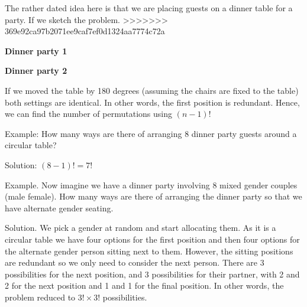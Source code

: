 \documentclass[12pt]{extbook}
\begin{document}
The rather dated idea here is that we are placing guests on a dinner table for a party.   If we sketch the problem.
>>>>>>> 369e92ca97b2071ee9caf7ef0d1324aa7774c72a

\begin{minipage}[t]{.45\textwidth}
\textbf{Dinner party 1}

\end{minipage}%
\begin{minipage}[t]{.45\textwidth}
\textbf{Dinner party 2}

\end{minipage}

If we moved the table by 180 degrees (assuming the chairs are fixed to the table) both settings are identical.   In other words, the first position is redundant.   Hence, we can find the number of permutations using $(n-1)!$


Example: How many ways are there of arranging 8 dinner party guests around a circular table?

Solution: $(8-1)! = 7!$

Example. Now imagine we have a dinner party involving 8 mixed gender couples (male female).   How many ways are there of arranging the dinner party so that we have alternate gender seating.

Solution.   We pick a gender at random and start allocating them.   As it is a circular table we have four options for the first position and then four options for the alternate gender person sitting next to them.   However, the sitting positions are redundant so we only need to consider the next person.   There are 3 possibilities for the next position, and 3 possibilities for their partner, with 2 and 2 for the next position and 1 and 1 for the final position.   In other words, the problem reduced to $3! \times 3!$ possibilities.
\end{document}
